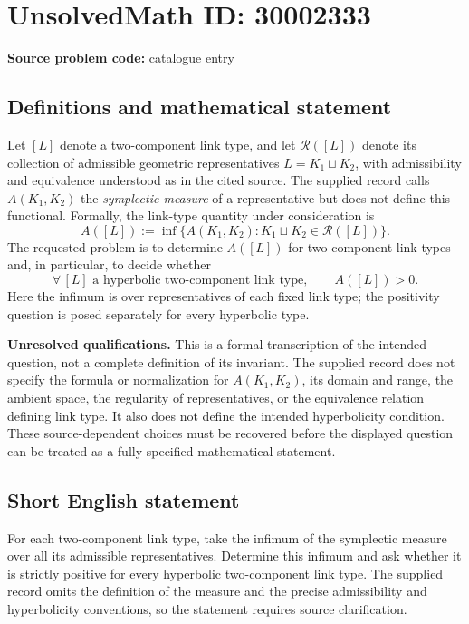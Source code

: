\documentclass[11pt]{article}
\begin{document}
\section*{UnsolvedMath ID: 30002333}
\textbf{Source problem code:} catalogue entry
\subsection{Definitions and mathematical statement}
Let \([L]\) denote a two-component link type, and let \(\mathcal{R}([L])\) denote its collection of admissible geometric representatives \(L=K_1\sqcup K_2\), with admissibility and equivalence understood as in the cited source. The supplied record calls \(A(K_1,K_2)\) the \emph{symplectic measure} of a representative but does not define this functional. Formally, the link-type quantity under consideration is
\[
A([L]) := \inf\bigl\{A(K_1,K_2):K_1\sqcup K_2\in\mathcal{R}([L])\bigr\}.
\]
The requested problem is to determine \(A([L])\) for two-component link types and, in particular, to decide whether
\[
\forall\,[L]\text{ a hyperbolic two-component link type},\qquad A([L])>0.
\]
Here the infimum is over representatives of each fixed link type; the positivity question is posed separately for every hyperbolic type.

\textbf{Unresolved qualifications.} This is a formal transcription of the intended question, not a complete definition of its invariant. The supplied record does not specify the formula or normalization for \(A(K_1,K_2)\), its domain and range, the ambient space, the regularity of representatives, or the equivalence relation defining link type. It also does not define the intended hyperbolicity condition. These source-dependent choices must be recovered before the displayed question can be treated as a fully specified mathematical statement.
\subsection{Short English statement}
For each two-component link type, take the infimum of the symplectic measure over all its admissible representatives. Determine this infimum and ask whether it is strictly positive for every hyperbolic two-component link type. The supplied record omits the definition of the measure and the precise admissibility and hyperbolicity conventions, so the statement requires source clarification.
\end{document}

